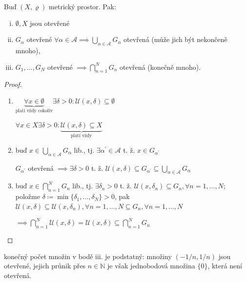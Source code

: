 \begin{veta}
    Buď $(X, \varrho)$ metrický prostor. Pak:
    \begin{enumerate}[i.]
  \item $\emptyset, X$ jsou otevřené
  \item $G_\alpha$ otevřené $\forall \alpha \in \mathcal A \implies \bigcup_{\alpha \in \mathcal A} G_\alpha$ otevřená (může jich být nekončeně mnoho),
  \item $G_1, \dots, G_N$ otevřené $\implies \bigcap_{n=1}^N G_n$ otevřená (konečně mnoho).
    \end{enumerate}
\end{veta}

\begin{proof}
    \begin{enumerate}[{ad} i.]
        \item $\underbrace{\forall x \in \emptyset}_{\text{platí vždy cokoliv}} \exists \delta>0: \mathscr U(x, \delta)\subseteq \emptyset$

        $\forall x \in X \exists \delta>0: \underbrace{\mathscr U(x, \delta) \subseteq X}_{\text{platí vždy}}$
        \item buď $x \in \bigcup_{\alpha \in \mathcal A} G_\alpha$ lib., tj. $\exists \alpha^\prime \in \mathcal A$ t. ž. $x \in G_{\alpha^\prime}$

        $G_{\alpha^\prime}$ otevřená $\implies \exists \delta >0$ t. ž. $\mathscr U(x, \delta) \subseteq G_{\alpha^\prime} \subseteq \bigcup_{\alpha\in\mathcal A} G_\alpha$
        \item buď $x \in \bigcap_{n=1}^N G_n$ lib., tj. $\exists \delta_n >0$ t. ž. $\mathscr U(x, \delta_n)\subseteq G_n, \forall n = 1, \dots, N$; položme $\delta \coloneq \min\{\delta_1, \dots, \delta_N\}>0$, pak $\mathscr U(x, \delta) \subseteq \mathscr U(x, \delta_n), \forall n = 1, \dots, N \subseteq G_n, \forall n = 1, \dots, N$

        $\implies  \bigcap_{n=1}^N \mathscr U(x, \delta) = \mathscr U(x, \delta)\subseteq \bigcap_{n=1}^N G_n$
    \end{enumerate}
\end{proof}

\begin{poznamka}
konečný počet množin v bodě iii. je podstatný: množiny $(-1/n, 1/n)$ jsou otevřené, jejich průnik přes $n \in \mathbb N$ je však jednobodová množina $\{0\}$, která není otevřená.
\end{poznamka}

